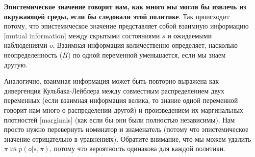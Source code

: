 \documentclass[twoside,leqno, 11pt]{article}
\begin{document}
	
	\textbf{Эпистемическое значение говорит нам, как много мы могли бы извлечь из окружающей среды, если бы следовали этой политике}. Так происходит потому, что эпистемическое значение представляет собой взаимную информацию [mutual information] между скрытыми состояниями $s$ и ожидаемыми наблюдениями $o$. Взаимная информация количественно определяет, насколько неопределенность ($H$) по одной переменной уменьшается, если мы знаем другую.
	
	
	\begin{figure}[h]
	\end{figure}
	
	Аналогично, взаимная информация может быть повторно выражена как дивергенция Кульбака-Лейблера между совместным распределением двух переменных (если взаимная информация велика, то знание одной переменной говорит нам много о распределении другой) и произведением их маргинальных плотностей [marginals] (как если бы они были полностью независимы). Нам просто нужно перевернуть номинатор и знаменатель (потому что эпистемическое значение отрицательно в уравнениях). Обратите внимание, что мы можем удалить $\pi$ из $p(o|s,\pi)$, потому что вероятность одинакова для каждой политики.
	
	
\end{document}
